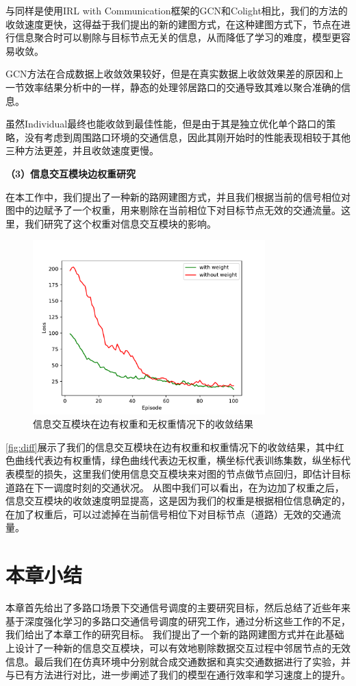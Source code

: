 与同样是使用IRL with Communication框架的GCN和Colight相比，我们的方法的收敛速度更快，这得益于我们提出的新的建图方式，在这种建图方式下，节点在进行信息聚合时可以剔除与目标节点无关的信息，从而降低了学习的难度，模型更容易收敛。

GCN方法在合成数据上收敛效果较好，但是在真实数据上收敛效果差的原因和上一节效率结果分析中的一样，静态的处理邻居路口的交通导致其难以聚合准确的信息。

虽然Individual最终也能收敛到最佳性能，但是由于其是独立优化单个路口的策略，没有考虑到周围路口环境的交通信息，因此其刚开始时的性能表现相较于其他三种方法更差，并且收敛速度更慢。

\textbf{（3）信息交互模块边权重研究}

在本工作中，我们提出了一种新的路网建图方式，并且我们根据当前的信号相位对图中的边赋予了一个权重，用来剔除在当前相位下对目标节点无效的交通流量。这里，我们研究了这个权重对信息交互模块的影响。
\begin{figure}[htb]
  \includegraphics[width=0.8\textwidth]{fig/diff.pdf}
  \caption{信息交互模块在边有权重和无权重情况下的收敛结果}
  \label{fig:diff}
\end{figure}

\autoref{fig:diff}展示了我们的信息交互模块在边有权重和权重情况下的收敛结果，其中红色曲线代表边有权重情，绿色曲线代表边无权重，横坐标代表训练集数，纵坐标代表模型的损失，这里我们使用信息交互模块来对图的节点做节点回归，即估计目标道路在下一调度时刻的交通状况。
从图中我们可以看出，在为边加了权重之后，信息交互模块的收敛速度明显提高，这是因为我们的权重是根据相位信息确定的，在加了权重后，可以过滤掉在当前信号相位下对目标节点（道路）无效的交通流量。

\section{本章小结}
本章首先给出了多路口场景下交通信号调度的主要研究目标，然后总结了近些年来基于深度强化学习的多路口交通信号调度的研究工作，通过分析这些工作的不足，我们给出了本章工作的研究目标。
我们提出了一个新的路网建图方式并在此基础上设计了一种新的信息交互模块，可以有效地剔除数据交互过程中邻居节点的无效信息。最后我们在仿真环境中分别就合成交通数据和真实交通数据进行了实验，并与已有方法进行对比，进一步阐述了我们的模型在通行效率和学习速度上的提升。